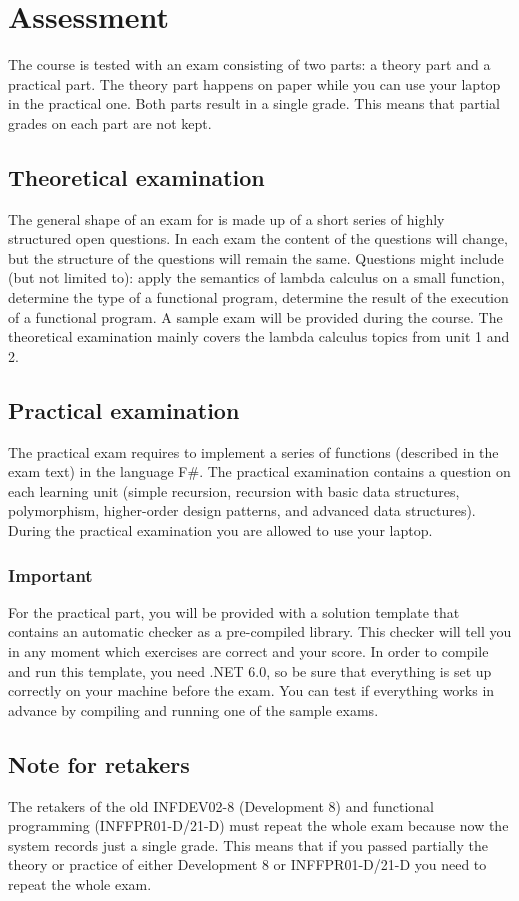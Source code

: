 \section{Assessment}
The course is tested with an exam consisting of two parts: a theory part and a practical part. The theory part happens on paper while you can use your laptop in the practical one. Both parts result in a single grade. This means that partial grades on each part are not kept. 

\subsection{Theoretical examination \modulecode}
The general shape of an exam for \texttt{\modulecode} is made up of a short series of highly structured open questions.
In each exam the content of the questions will change, but the structure of the questions will remain the same. Questions might include (but not limited to): apply the semantics of lambda calculus on a small function, determine the type of a functional program, determine the result of the execution of a functional program. A sample exam will be provided during the course. The theoretical examination mainly covers the lambda calculus topics from unit 1 and 2.

\subsection{Practical examination \modulecode}
The practical exam requires to implement a series of functions (described in the exam text) in the language F\#. The practical examination contains a question on each learning unit (simple recursion, recursion with basic data structures, polymorphism, higher-order design patterns, and advanced data structures). During the practical examination you are allowed to use your laptop.

\subsubsection{Important}
For the practical part, you will be provided with a solution template that contains an automatic checker as a pre-compiled library. This checker will tell you in any moment which exercises are correct and your score. In order to compile and run this template, you need .NET 6.0, so be sure that everything is set up correctly on your machine before the exam. You can test if everything works in advance by compiling and running one of the sample exams.

\subsection{Note for retakers}
The retakers of the old INFDEV02-8 (Development 8) and functional programming (INFFPR01-D/21-D) must repeat the whole exam because now the system records just a single grade. This means that if you passed partially the theory or practice of either Development 8 or INFFPR01-D/21-D you need to repeat the whole exam.
